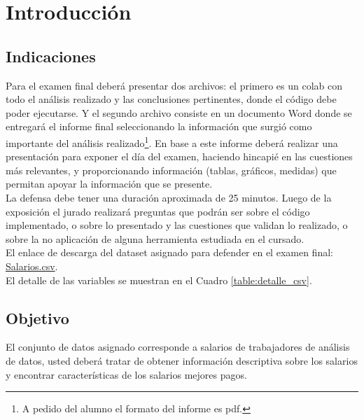 \section{Introducci\'on}
%
\subsection{Indicaciones}
%
Para el examen final deberá presentar dos archivos: el primero es un colab con todo el análisis realizado y las conclusiones pertinentes, donde el código debe poder ejecutarse. Y el segundo archivo consiste en un documento Word donde se entregará el informe final seleccionando la información que surgió como importante del análisis realizado\footnote{A pedido del alumno el formato del informe es pdf.}. En base a este informe deberá realizar una presentación para exponer el día del examen, haciendo hincapié en las cuestiones más relevantes, y proporcionando información (tablas, gráficos, medidas) que permitan apoyar la información que se presente.\\

La defensa debe tener una duración aproximada de 25 minutos. Luego de la exposición el jurado realizará preguntas que podrán ser sobre el código implementado, o sobre lo presentado y las cuestiones que validan lo realizado, o sobre la no aplicación de alguna herramienta estudiada en el cursado.\\

El enlace de descarga del dataset asignado para defender en el examen final: 
\href{https://drive.google.com/file/d/1NnOvk3UtVGYxelG_qlK_TkaYu47sYthx/view?pli=1}{Salarios.csv}.\\

El detalle de las variables se muestran en el Cuadro \ref{table:detalle_csv}.



\subsection{Objetivo}
%
El conjunto de datos asignado corresponde a salarios de trabajadores de análisis de datos, usted deberá tratar de obtener información descriptiva sobre los salarios y encontrar características de los salarios mejores pagos.\\
